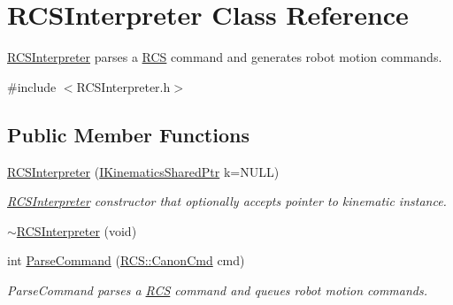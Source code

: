 \hypertarget{classRCSInterpreter}{\section{R\-C\-S\-Interpreter Class Reference}
\label{classRCSInterpreter}
}


\hyperlink{classRCSInterpreter}{R\-C\-S\-Interpreter} parses a \hyperlink{namespaceRCS}{R\-C\-S} command and generates robot motion commands.  




{\ttfamily \#include $<$R\-C\-S\-Interpreter.\-h$>$}

\subsection*{Public Member Functions}
\begin{DoxyCompactItemize}
\item 
\hyperlink{classRCSInterpreter_abf39be78f8107db4844c33434fe33caf}{R\-C\-S\-Interpreter} (\hyperlink{Kinematics_8h_aa720b9842c846588baf215581fb9f902}{I\-Kinematics\-Shared\-Ptr} k=N\-U\-L\-L)
\begin{DoxyCompactList}\small\item\em \hyperlink{classRCSInterpreter}{R\-C\-S\-Interpreter} constructor that optionally accepts pointer to kinematic instance. \end{DoxyCompactList}\item 
\hyperlink{classRCSInterpreter_a540468718197e24d7c20cc1f43696715}{$\sim$\-R\-C\-S\-Interpreter} (void)
\item 
int \hyperlink{classRCSInterpreter_a7f7cee6a3606a2b3f22ca3f802a1fc39}{Parse\-Command} (\hyperlink{structRCS_1_1CanonCmd}{R\-C\-S\-::\-Canon\-Cmd} cmd)
\begin{DoxyCompactList}\small\item\em Parse\-Command parses a \hyperlink{namespaceRCS}{R\-C\-S} command and queues robot motion commands. \end{DoxyCompactList}\end{DoxyCompactItemize}
